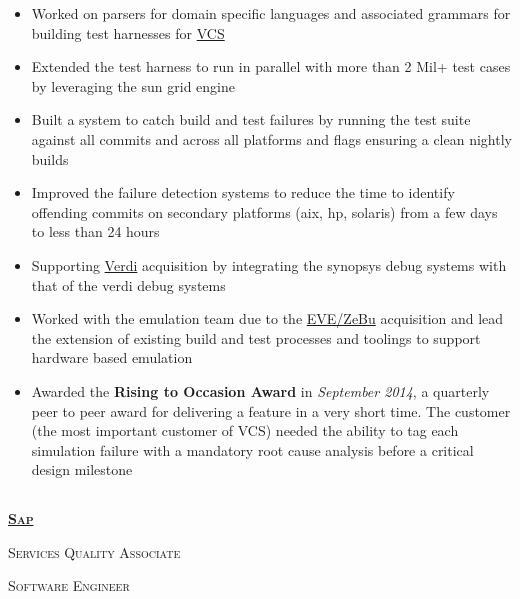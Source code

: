 \documentclass{article}
\begin{document}
\begin{itemize}[noitemsep,nolistsep]
\item Worked on parsers for domain specific languages and associated grammars for building test harnesses for \href{https://www.synopsys.com/verification/simulation/vcs.html}{VCS}
\item Extended the test harness to run in parallel with more than 2 Mil+ test cases by leveraging the sun grid engine
\item Built a system to catch build and test failures by running the test suite against all commits and across all platforms and flags ensuring a clean nightly builds
\item Improved the failure detection systems to reduce the time to identify offending commits on secondary platforms (aix, hp, solaris) from a few days to less than 24 hours
\item Supporting \href{https://www.synopsys.com/verification/debug/verdi.html}{Verdi} acquisition by integrating the synopsys debug systems with that of the verdi debug systems
\item Worked with the emulation team due to the \href{https://www.synopsys.com/verification/emulation.html}{EVE/ZeBu} acquisition and lead the extension of existing build and test processes and toolings to support hardware based emulation
\item Awarded the \textbf{Rising to Occasion Award} in \textit{September 2014}, a quarterly peer to peer award for delivering a feature in a very short time. The customer (the most important customer of VCS) needed the ability to tag each simulation failure with a mandatory root cause analysis before a critical design milestone
\end{itemize}

\subsection[Sap]{}
{\raggedright{\textsc{\textbf{\href{https://www.sap.com/index.html}{Sap}}}}} \hfill {}

{\raggedright{\textsc{Services Quality Associate}}} \hfill {}

{\raggedright{\textsc{Software Engineer}}} \hfill {}
\end{document}
